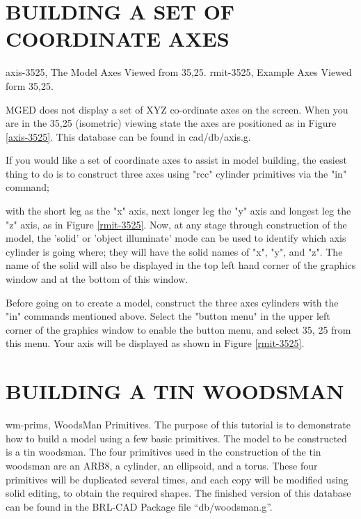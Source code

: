 \chapter{BUILDING A SET OF COORDINATE AXES}
\mfig axis-3525, The Model Axes Viewed from 35,25.
\mfig rmit-3525, Example Axes Viewed form 35,25.

MGED does not display a set of XYZ co-ordinate axes on the
screen.
When you are in the 35,25 (isometric) viewing state the axes are
positioned as in Figure \ref{axis-3525}.
This database can be found in cad/db/axis.g.

If you would like a set of coordinate axes to assist in model building,
the easiest thing to do is to
construct three axes using "rcc" cylinder primitives via the "in" command;


with the short leg as the "x" axis, next longer leg the "y" axis and longest
leg the "z" axis,
as in Figure \ref{rmit-3525}.
Now, at any stage through construction of the model,
the 'solid' or 'object illuminate' mode can be used
to identify which axis cylinder is going where; they
will have the solid names of "x", "y", and "z".
The name of the solid will also be
displayed in the top left hand corner of the graphics window
and at the bottom of this window.

Before going on to create a model, construct the three axes cylinders
with the "in" commands mentioned above.
Select the "button menu" in the
upper left corner of the graphics window
to enable the button menu, and
select 35, 25 from this menu.
Your axis will be displayed as shown in Figure \ref{rmit-3525}.
\chapter{BUILDING A TIN WOODSMAN}

\mfig wm-prims, WoodsMan Primitives.
The purpose of this tutorial is to demonstrate how to build a model using
a few basic primitives.  The model to be constructed is a tin woodsman.
The four primitives used in the construction of the tin woodsman
are an ARB8, a cylinder, an ellipsoid, and a torus.
These four primitives will be duplicated several times,
and each copy will be modified using solid editing,
to obtain the required shapes.
The finished version of this database can be found in
the BRL-CAD Package file ``db/woodsman.g''.

